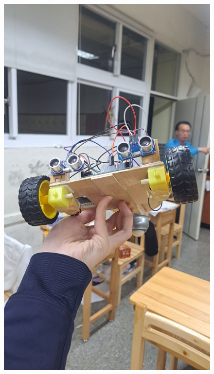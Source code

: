 \documentclass[a4paper,12pt]{article}
\begin{document}
\begin{center}\begin{figure}[H]\centering
\hfill
\begin{minipage}[t]{0.45\textwidth}
\centering
\includegraphics[width=\textwidth]{./photos/c.jpg}
\end{minipage}
\hfill
\begin{minipage}[t]{0.45\textwidth}
\centering

\end{minipage}
\end{figure}
\end{center}
\end{document}
